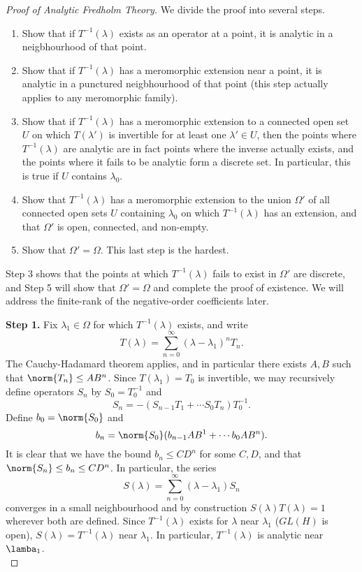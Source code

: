 \documentclass[12pt]{article}
\begin{document}
\begin{proof}[Proof of Analytic Fredholm Theory]
We divide the proof into several steps.
\begin{enumerate}
\item Show that if $T^{-1}(\lambda)$ exists as an operator at a point, it is analytic in a neigbhourhood of that point.
\item Show that if $T^{-1}(\lambda)$ has a meromorphic extension near a point, it is analytic in a punctured neigbhourhood of that point (this step actually applies to any meromorphic family).
\item Show that if $T^{-1}(\lambda)$ has a meromorphic extension to a connected open set $U$ on which $T(\lambda')$ is invertible for at least one $\lambda' \in U$, then the points where $T^{-1}(\lambda)$ are analytic are in fact points where the inverse actually exists, and the points where it fails to be analytic form a discrete set. In particular, this is true if $U$ contains $\lambda_0$.
\item Show that $T^{-1}(\lambda)$ has a meromorphic extension to the union $\Omega'$ of all connected open sets $U$ containing $\lambda_0$ on which $T^{-1}(\lambda)$ has an extension, and that $\Omega'$ is open, connected, and non-empty.
\item Show that $\Omega' = \Omega$. This last step is the hardest.
\end{enumerate}
Step 3 shows that the points at which $T^{-1}(\lambda)$ fails to exist in $\Omega'$ are discrete, and Step 5 will show that $\Omega'=\Omega$ and complete the proof of existence. We will address the finite-rank of the negative-order coefficients later.

\textbf{Step 1. }Fix $\lambda_1 \in \Omega$ for which $T^{-1}(\lambda)$ exists, and write
\[T(\lambda) = \sum_{n=0}^\infty (\lambda-\lambda_1)^nT_n.\]
 The Cauchy-Hadamard theorem applies, and in particular there exists $A,B$ such that $\norm{T_n} \leq AB^n$. Since $T(\lambda_1) = T_0$ is invertible, we may recursively define operators $S_n$ by $S_0 = T_0^{-1}$ and
 \[S_n = -(S_{n-1}T_1 + \cdots S_0T_n)T_0^{-1}.\] Define $b_0 = \norm{S_0}$ and
 \[b_n = \norm{S_0}(b_{n-1}AB^{1} + \cdots b_0AB^n).\] It is clear that we have the bound $b_n \leq CD^n$ for some $C,D$, and that $\norm{S_n} \leq b_n \leq CD^n$. In particular, the series
 \[S(\lambda) = \sum_{n=0}^\infty (\lambda-\lambda_1)S_n\] converges in a small neighbourhood and by construction $S(\lambda)T(\lambda) = 1$ wherever both are defined. Since $T^{-1}(\lambda)$ exists for $\lambda$ near $\lambda_1$ ($GL(H)$ is open), $S(\lambda) = T^{-1}(\lambda)$ near $\lambda_1$. In particular, $T^{-1}(\lambda)$ is analytic near $\lamba_1$.\\
 

\end{proof}
\end{document}
